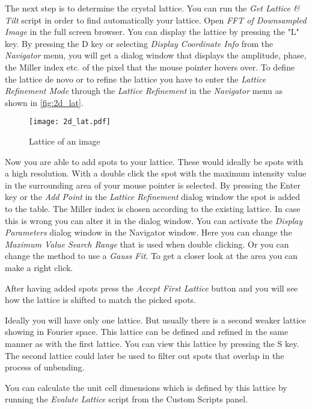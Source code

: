 The next step is to determine the crystal lattice. You can run the \textit{Get Lattice \& Tilt} script in order to find automatically your lattice. Open \textit{FFT of Downsampled Image} in the full screen browser. You can display the lattice by pressing the "L" key.
By pressing the D key or selecting \textit{Display Coordinate Info} from the \textit{Navigator} menu, you will get a dialog window that displays the amplitude, phase, the Miller index etc. of the pixel that the mouse pointer hovers over. To define the lattice de novo or to refine the lattice you have to enter the \textit{Lattice Refinement Mode} through the \textit{Lattice Refinement} in the \textit{Navigator} menu as shown in \autoref{fig:2d_lat}.
	
	\begin{figure}[H]
		\centering
		\texttt{[image: 2d\_lat.pdf]}
		\caption{Lattice of an image}
		\label{fig:2d_lat}
	\end{figure}
	
	Now you are able to add spots to your lattice. These would ideally be spots with a high resolution. With a double click the spot with the maximum intensity value in the surrounding area of your mouse pointer is selected. By pressing the Enter key or the \textit{Add Point} in the \textit{Lattice Refinement} dialog window the spot is added to the table. The Miller index is chosen according to the existing lattice. In case this is wrong you can alter it in the dialog window. You can activate the \textit{Display Parameters} dialog window in the Navigator window. Here you can change the \textit{Maximum Value Search Range} that is used when double clicking. Or you can change the method to use a \textit{Gauss Fit}. To get a closer look at the area you can make a right click. 
	
After having added spots press the \textit{Accept First Lattice} button and you will see how the lattice is shifted to match the picked spots.
	
Ideally you will have only one lattice. But usually there is a second weaker lattice showing in Fourier space. This lattice can be defined and refined in the same manner as with the first lattice. You can view this lattice by pressing the S key. The second lattice could later be used to filter out spots that overlap in the process of unbending.

You can calculate the unit cell dimensions which is defined by this lattice by running  the \textit{Evalute Lattice} script from the Custom Scripts panel.




